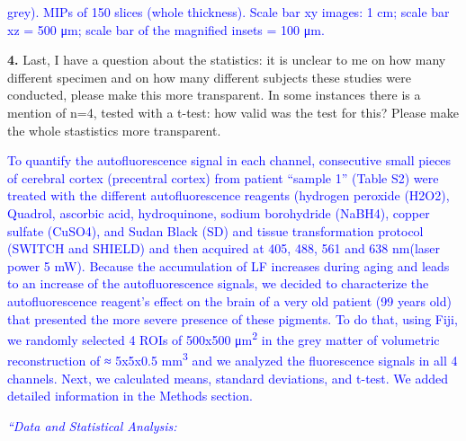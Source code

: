 \documentclass{article}
\newcommand{\reply}[1]{\textcolor{blue}{#1}}
\begin{document}
\noindent {}\reply{grey). MIPs of 150 slices (whole thickness). Scale bar xy images: 1 cm; scale bar xz = 500 μm;} \reply{scale bar of the magnified insets = 100 μm.}

\noindent \textbf{4.} Last, I have a question about the statistics: it is unclear to me on how many different specimen and on how many different subjects these studies were conducted, please make this more transparent. In some instances there is a mention of n=4, tested with a t-test: how valid was the test for this? Please make the whole stastistics more transparent.

\noindent \reply{To quantify the autofluorescence signal in each channel, consecutive small pieces of cerebral} \reply{cortex (precentral cortex) from patient “sample 1” (Table S2) were treated with the different} \reply{autofluorescence reagents (hydrogen peroxide (H2O2), Quadrol, ascorbic acid, hydroquinone,} \reply{sodium borohydride (NaBH4), copper sulfate (CuSO4), and Sudan Black (SD) and tissue} \reply{transformation protocol (SWITCH and SHIELD) and then acquired at 405, 488, 561 and 638} \reply{nm(laser power 5 mW). Because the accumulation of LF increases during aging and leads to an} \reply{increase of the autofluorescence signals, we decided to characterize the autofluorescence} \reply{reagent’s effect on the brain of a very old patient (99 years old) that presented the more severe} \reply{presence of these pigments. To do that, using Fiji, we randomly selected 4 ROIs of 500x500 μm}\reply{\textsuperscript{2}} \reply{in} \reply{the grey matter of volumetric reconstruction of ≈ 5x5x0.5 mm}\reply{\textsuperscript{3}} \reply{and we analyzed the fluorescence} \reply{signals in all 4 channels. Next, we calculated means, standard deviations, and t-test. We added} \reply{detailed information in the Methods section.}

\noindent \reply{\emph{“Data and Statistical Analysis:}}
\end{document}
